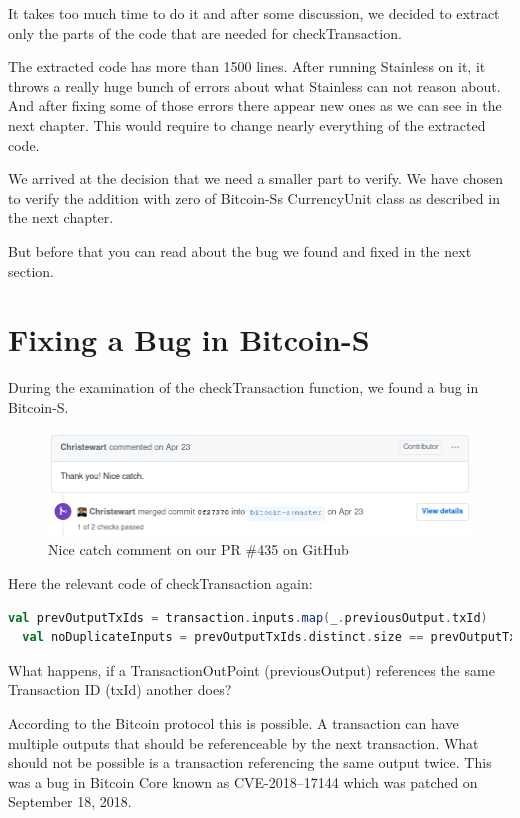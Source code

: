 It takes too much time to do it and after some discussion, we decided to extract only the parts of the code that are needed for checkTransaction.

The extracted code has more than 1500 lines.
After running Stainless on it, it throws a really huge bunch of errors about what Stainless can not reason about.
And after fixing some of those errors there appear new ones as we can see in the next chapter.
This would require to change nearly everything of the extracted code.

We arrived at the decision that we need a smaller part to verify.
We have chosen to verify the addition with zero of Bitcoin-Ss CurrencyUnit class as described in the next chapter.

But before that you can read about the bug we found and fixed in the next section.


\section{Fixing a Bug in Bitcoin-S}

During the examination of the checkTransaction function, we found a bug in Bitcoin-S.

\begin{figure}[H]
	\centering
		\includegraphics[scale=0.5]{images/bitcoin-s-pr-comment.png}
	\caption{Nice catch comment on our PR \#435 on GitHub}
	\label{fig:output1}
\end{figure}

Here the relevant code of checkTransaction again:
\begin{lstlisting}[language=scala]
  val prevOutputTxIds = transaction.inputs.map(_.previousOutput.txId)
  val noDuplicateInputs = prevOutputTxIds.distinct.size == prevOutputTxIds.size
\end{lstlisting}

What happens, if a TransactionOutPoint (previousOutput) references the same Transaction ID (txId) another does?

According to the Bitcoin protocol this is possible.
A transaction can have multiple outputs that should be referenceable by the next transaction.
What should not be possible is a transaction referencing the same output twice.
This was a bug in Bitcoin Core known as CVE-2018–17144 which was patched on September 18, 2018.

